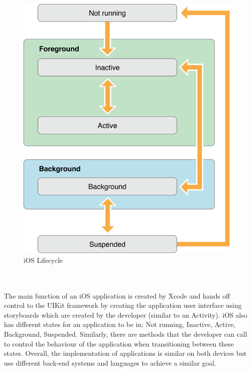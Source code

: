 \documentclass[a4paper]{report}
\begin{document}
\begin{figure}[h]
	\centering
	\includegraphics[scale=0.25]{ios_life_cycle}
	\caption{iOS Lifecycle \cite{Apple}}
\end{figure}
\pagebreak
\\\\
The main function of an iOS application is created by Xcode and hands off control to the UIKit framework by creating the application user interface using storyboards which are created by the developer (similar to an Activity). iOS also has different states for an application to be in; Not running, Inactive, Active, Background, Suspended. Similarly, there are methods that the developer can call to control the behaviour of the application when transitioning between these states. Overall, the implementation of applications is similar on both devices but use different back-end systems and languages to achieve a similar goal.
\end{document}
